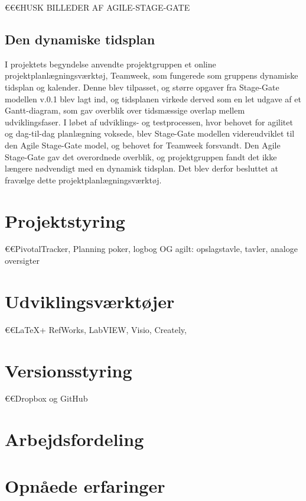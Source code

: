 	€€€HUSK BILLEDER AF AGILE-STAGE-GATE 
	
\subsection{Den dynamiske tidsplan} 
I projektets begyndelse anvendte projektgruppen et online projektplanlægningsværktøj, Teamweek, som fungerede som gruppens dynamiske tidsplan og kalender. Denne blev tilpasset, og større opgaver fra Stage-Gate modellen v.0.1 blev lagt ind, og tidsplanen virkede derved som en let udgave af et Gantt-diagram, som gav overblik over tidsmæssige overlap mellem udviklingsfaser. I løbet af udviklings- og testprocessen, hvor behovet for agilitet og dag-til-dag planlægning voksede, blev Stage-Gate modellen videreudviklet til den Agile Stage-Gate model, og behovet for Teamweek forsvandt. Den Agile Stage-Gate gav det overordnede overblik, og projektgruppen fandt det ikke længere nødvendigt med en dynamisk tidsplan. Det blev derfor besluttet at fravælge dette projektplanlægningsværktøj.   

\section{Projektstyring}
	€€PivotalTracker, Planning poker, logbog OG agilt: opslagstavle, tavler, analoge oversigter

\section{Udviklingsværktøjer}
	€€LaTeX+ RefWorks, LabVIEW, Visio, Creately, 

\section{Versionsstyring}
 	€€Dropbox og GitHub

\section{Arbejdsfordeling}

\section{Opnåede erfaringer}